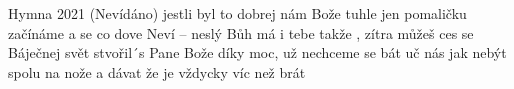 \begin{TEXT}{Hymna 2021 (Nevídáno)}
\SLOKA {} jestli byl to dobrej \NL
{} nám Bože  tuhle \NL
jen pomaličku začínáme \NL
a  se co  dove\NL
\REFREN Neví – neslý \NL
{} Bůh má  i tebe \NL
takže , zítra \NL
{} můžeš  ces se \NL
\SLOKA Báječnej svět stvořil´s Pane Bože\NL
díky moc, už nechceme se bát\NL
uč nás jak nebýt spolu na nože\NL
a dávat že je vždycky víc než brát\NL
\end{TEXT}